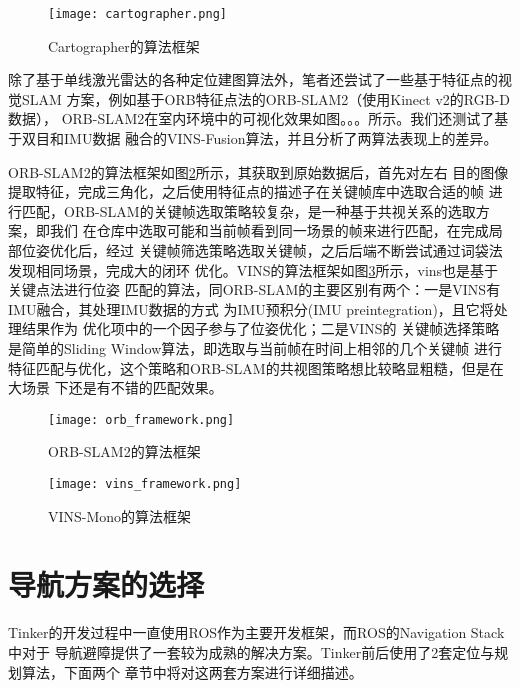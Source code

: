 \begin{figure}[h] %
  \centering
  \texttt{[image: cartographer.png]}
  \caption{Cartographer的算法框架}
  \label{fig:cartographer}
\end{figure}

除了基于单线激光雷达的各种定位建图算法外，笔者还尝试了一些基于特征点的视觉SLAM
方案，例如基于ORB特征点法的ORB-SLAM2（使用Kinect v2的RGB-D数据）\cite{mur2015orb}，
ORB-SLAM2在室内环境中的可视化效果如图。。。所示。我们还测试了基于双目和IMU数据
融合的VINS-Fusion\cite{qin2018vins}算法，并且分析了两算法表现上的差异。

ORB-SLAM2的算法框架如图\ref{fig:orb_frame}所示，其获取到原始数据后，首先对左右
目的图像提取特征，完成三角化，之后使用特征点的描述子在关键帧库中选取合适的帧
进行匹配，ORB-SLAM的关键帧选取策略较复杂，是一种基于共视关系的选取方案，即我们
在仓库中选取可能和当前帧看到同一场景的帧来进行匹配，在完成局部位姿优化后，经过
关键帧筛选策略选取关键帧，之后后端不断尝试通过词袋法发现相同场景，完成大的闭环
优化。VINS的算法框架如图\ref{fig:vins_frame}所示，vins也是基于关键点法进行位姿
匹配的算法，同ORB-SLAM的主要区别有两个：一是VINS有IMU融合，其处理IMU数据的方式
为IMU预积分(IMU preintegration)\cite{forster2015manifold}，且它将处理结果作为
优化项中的一个因子参与了位姿优化；二是VINS的
关键帧选择策略是简单的Sliding Window算法，即选取与当前帧在时间上相邻的几个关键帧
进行特征匹配与优化，这个策略和ORB-SLAM的共视图策略想比较略显粗糙，但是在大场景
下还是有不错的匹配效果。


\begin{figure}[h] %
  \centering
  \texttt{[image: orb\_framework.png]}
  \caption{ORB-SLAM2的算法框架}
  \label{fig:orb_frame}
\end{figure}


\begin{figure}[h] %
  \centering
  \texttt{[image: vins\_framework.png]}
  \caption{VINS-Mono的算法框架}
  \label{fig:vins_frame}
\end{figure}

\section{导航方案的选择}

Tinker的开发过程中一直使用ROS作为主要开发框架，而ROS的Navigation Stack中对于
导航避障提供了一套较为成熟的解决方案。Tinker前后使用了2套定位与规划算法，下面两个
章节中将对这两套方案进行详细描述。

